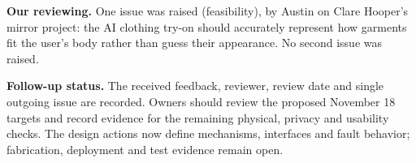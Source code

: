 \documentclass[12pt,letterpaper]{article}
\begin{document}
\textbf{Our reviewing.} One issue was raised (feasibility), by Austin on Clare Hooper's mirror project: the AI clothing try-on should accurately represent how garments fit the user's body rather than guess their appearance. No second issue was raised.

\textbf{Follow-up status.} The received feedback, reviewer, review date and single outgoing issue are recorded. Owners should review the proposed November 18 targets and record evidence for the remaining physical, privacy and usability checks. The design actions now define mechanisms, interfaces and fault behavior; fabrication, deployment and test evidence remain open.
\end{document}
